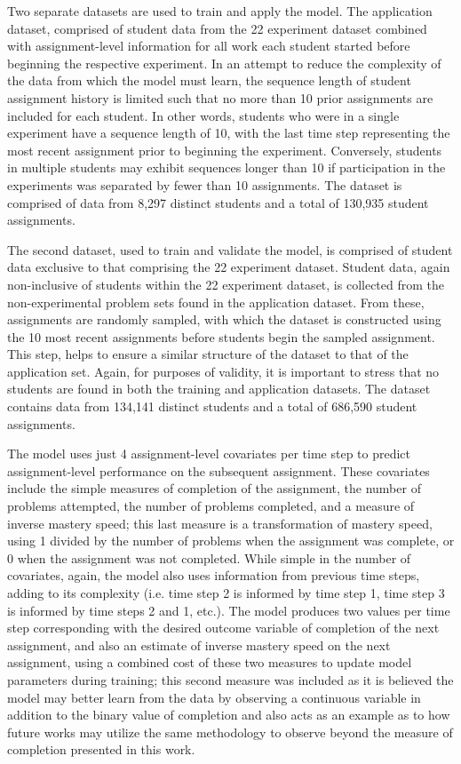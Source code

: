 \documentclass{edm_template}
\begin{document}
Two separate datasets are used to train and apply the model. The application dataset, comprised of student data from the 22 experiment dataset combined with assignment-level information for all work each student started before beginning the respective experiment. In an attempt to reduce the complexity of the data from which the model must learn, the sequence length of student assignment history is limited such that no more than 10 prior assignments are included for each student. In other words, students who were in a single experiment have a sequence length of 10, with the last time step representing the most recent assignment prior to beginning the experiment. Conversely, students in multiple students may exhibit sequences longer than 10 if participation in the experiments was separated by fewer than 10 assignments. The dataset is comprised of data from 8,297 distinct students and a total of 130,935 student assignments.

The second dataset, used to train and validate the model, is comprised of student data exclusive to that comprising the 22 experiment dataset. Student data, again non-inclusive of students within the 22 experiment dataset, is collected from the non-experimental problem sets found in the application dataset. From these, assignments are randomly sampled, with which the dataset is constructed using the 10 most recent assignments before students begin the sampled assignment. This step, helps to ensure a similar structure of the dataset to that of the application set. Again, for purposes of validity, it is important to stress that no students are found in both the training and application datasets. The dataset contains data from 134,141 distinct students and a total of 686,590 student assignments.

The model uses just 4 assignment-level covariates per time step to predict assignment-level performance on the subsequent assignment. These covariates include the simple measures of completion of the assignment, the number of problems attempted, the number of problems completed, and a measure of inverse mastery speed; this last measure is a transformation of mastery speed, using 1 divided by the number of problems when the assignment was complete, or 0 when the assignment was not completed. While simple in the number of covariates, again, the model also uses information from previous time steps, adding to its complexity (i.e. time step 2 is informed by time step 1, time step 3 is informed by time steps 2 and 1, etc.). The model produces two values per time step corresponding with the desired outcome variable of completion of the next assignment, and also an estimate of inverse mastery speed on the next assignment, using a combined cost of these two measures to update model parameters during training; this second measure was included as it is believed the model may better learn from the data by observing a continuous variable in addition to the binary value of completion and also acts as an example as to how future works may utilize the same methodology to observe beyond the measure of completion presented in this work.
\end{document}
